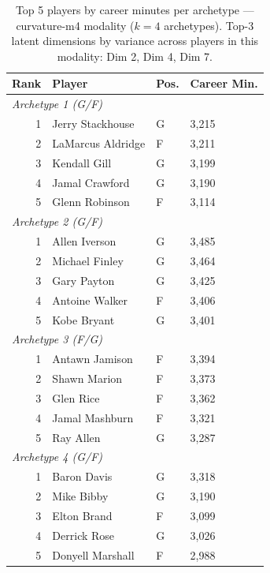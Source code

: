\begin{table}[htbp]
  \centering\small
  \begin{tabular}{rlll}
    \toprule
    Rank & Player & Pos. & Career Min. \\
    \midrule
    \multicolumn{4}{l}{\textit{Archetype 1 (G/F)}} \\
    \midrule
    1 & Jerry Stackhouse & G & 3,215 \\
    2 & LaMarcus Aldridge & F & 3,211 \\
    3 & Kendall Gill & G & 3,199 \\
    4 & Jamal Crawford & G & 3,190 \\
    5 & Glenn Robinson & F & 3,114 \\
    \midrule[0.4pt]
    \multicolumn{4}{l}{\textit{Archetype 2 (G/F)}} \\
    \midrule
    1 & Allen Iverson & G & 3,485 \\
    2 & Michael Finley & G & 3,464 \\
    3 & Gary Payton & G & 3,425 \\
    4 & Antoine Walker & F & 3,406 \\
    5 & Kobe Bryant & G & 3,401 \\
    \midrule[0.4pt]
    \multicolumn{4}{l}{\textit{Archetype 3 (F/G)}} \\
    \midrule
    1 & Antawn Jamison & F & 3,394 \\
    2 & Shawn Marion & F & 3,373 \\
    3 & Glen Rice & F & 3,362 \\
    4 & Jamal Mashburn & F & 3,321 \\
    5 & Ray Allen & G & 3,287 \\
    \midrule[0.4pt]
    \multicolumn{4}{l}{\textit{Archetype 4 (G/F)}} \\
    \midrule
    1 & Baron Davis & G & 3,318 \\
    2 & Mike Bibby & G & 3,190 \\
    3 & Elton Brand & F & 3,099 \\
    4 & Derrick Rose & G & 3,026 \\
    5 & Donyell Marshall & F & 2,988 \\
    \bottomrule
  \end{tabular}
  \caption{Top 5 players by career minutes per archetype --- curvature-m4 modality ($k=4$ archetypes). Top-3 latent dimensions by variance across players in this modality: Dim 2, Dim 4, Dim 7.}
  \label{tab:arch_reps_curvature_m4}
\end{table}

